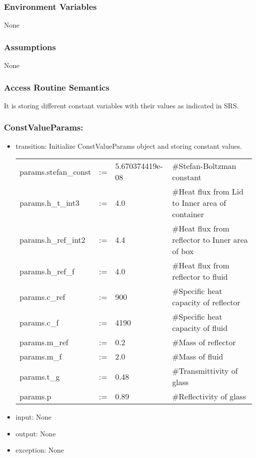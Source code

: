 \documentclass[12pt, titlepage]{article}
\begin{document}
\subsubsection{Environment Variables}

None

\subsubsection{Assumptions}

None

\subsubsection{Access Routine Semantics}
It is storing different constant variables with their values as indicated in SRS. 
\subsubsection*{ConstValueParams:}
\begin{itemize}
\item transition: Initialize ConstValueParams object and storing constant values.  
\begin{center}
\begin{tabular}{p{3.3cm} p{0.2cm} p{3cm} p{7cm}}
params.stefan\_const & := & 5.670374419e-08 & \#Stefan-Boltzman constant\\
params.h\_t\_int3 & := & 4.0 & \#Heat flux from Lid to Inner area of container\\
params.h\_ref\_int2 & := & 4.4 & \#Heat flux from reflector to Inner area of box \\ 
params.h\_ref\_f & := & 4.0 & \#Heat flux from reflector to fluid \\
params.c\_ref & := & 900 & \#Specific heat capacity of reflector \\
params.c\_f & := & 4190 & \#Specific heat capacity of fluid \\
params.m\_ref & := & 0.2 & \#Mass of reflector \\
params.m\_f & := & 2.0 & \#Mass of fluid \\
params.t\_g & := & 0.48 & \#Transmittivity of glass \\ 
params.p & := & 0.89 & \#Reflectivity of glass \\ 
\end{tabular}
\end{center}
\item input: None
\item output: None
\item exception: None
\end{itemize}
\end{document}

